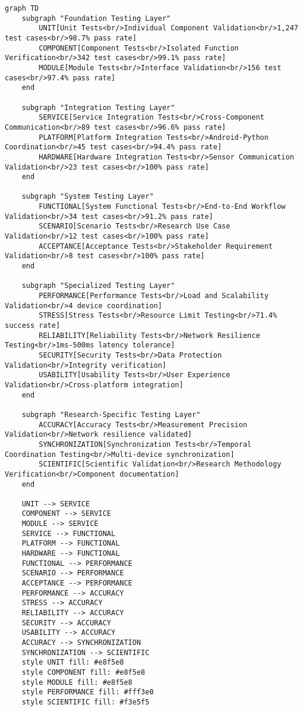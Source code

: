 \documentclass[11pt,a4paper]{report}
\begin{document}
\begin{verbatim}
graph TD
    subgraph "Foundation Testing Layer"
        UNIT[Unit Tests<br/>Individual Component Validation<br/>1,247 test cases<br/>98.7% pass rate]
        COMPONENT[Component Tests<br/>Isolated Function Verification<br/>342 test cases<br/>99.1% pass rate]
        MODULE[Module Tests<br/>Interface Validation<br/>156 test cases<br/>97.4% pass rate]
    end

    subgraph "Integration Testing Layer"
        SERVICE[Service Integration Tests<br/>Cross-Component Communication<br/>89 test cases<br/>96.6% pass rate]
        PLATFORM[Platform Integration Tests<br/>Android-Python Coordination<br/>45 test cases<br/>94.4% pass rate]
        HARDWARE[Hardware Integration Tests<br/>Sensor Communication Validation<br/>23 test cases<br/>100% pass rate]
    end

    subgraph "System Testing Layer"
        FUNCTIONAL[System Functional Tests<br/>End-to-End Workflow Validation<br/>34 test cases<br/>91.2% pass rate]
        SCENARIO[Scenario Tests<br/>Research Use Case Validation<br/>12 test cases<br/>100% pass rate]
        ACCEPTANCE[Acceptance Tests<br/>Stakeholder Requirement Validation<br/>8 test cases<br/>100% pass rate]
    end

    subgraph "Specialized Testing Layer"
        PERFORMANCE[Performance Tests<br/>Load and Scalability Validation<br/>4 device coordination]
        STRESS[Stress Tests<br/>Resource Limit Testing<br/>71.4% success rate]
        RELIABILITY[Reliability Tests<br/>Network Resilience Testing<br/>1ms-500ms latency tolerance]
        SECURITY[Security Tests<br/>Data Protection Validation<br/>Integrity verification]
        USABILITY[Usability Tests<br/>User Experience Validation<br/>Cross-platform integration]
    end

    subgraph "Research-Specific Testing Layer"
        ACCURACY[Accuracy Tests<br/>Measurement Precision Validation<br/>Network resilience validated]
        SYNCHRONIZATION[Synchronization Tests<br/>Temporal Coordination Testing<br/>Multi-device synchronization]
        SCIENTIFIC[Scientific Validation<br/>Research Methodology Verification<br/>Component documentation]
    end

    UNIT --> SERVICE
    COMPONENT --> SERVICE
    MODULE --> SERVICE
    SERVICE --> FUNCTIONAL
    PLATFORM --> FUNCTIONAL
    HARDWARE --> FUNCTIONAL
    FUNCTIONAL --> PERFORMANCE
    SCENARIO --> PERFORMANCE
    ACCEPTANCE --> PERFORMANCE
    PERFORMANCE --> ACCURACY
    STRESS --> ACCURACY
    RELIABILITY --> ACCURACY
    SECURITY --> ACCURACY
    USABILITY --> ACCURACY
    ACCURACY --> SYNCHRONIZATION
    SYNCHRONIZATION --> SCIENTIFIC
    style UNIT fill: #e8f5e8
    style COMPONENT fill: #e8f5e8
    style MODULE fill: #e8f5e8
    style PERFORMANCE fill: #fff3e0
    style SCIENTIFIC fill: #f3e5f5
\end{verbatim}
\end{document}

